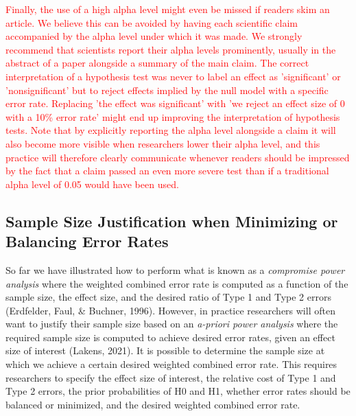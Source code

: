 \documentclass[
  english,
  ,man, a4paper,floatsintext]{apa6}
\begin{document}
\textcolor{red}{Finally, the use of a high alpha level might even be missed if readers skim an article. We believe this can be avoided by having each scientific claim accompanied by the alpha level under which it was made. We strongly recommend that scientists report their alpha levels prominently, usually in the abstract of a paper alongside a summary of the main claim. The correct interpretation of a hypothesis test was never to label an effect as 'significant' or 'nonsignificant' but to reject effects implied by the null model with a specific error rate. Replacing 'the effect was significant' with 'we reject an effect size of 0 with a 10\% error rate' might end up improving the interpretation of hypothesis tests. Note that by explicitly reporting the alpha level alongside a claim it will also become more visible when researchers lower their alpha level, and this practice will therefore clearly communicate whenever readers should be impressed by the fact that a claim passed an even more severe test than if a traditional alpha level of 0.05 would have been used.}

\hypertarget{sample-size-justification-when-minimizing-or-balancing-error-rates}{%
\subsection{Sample Size Justification when Minimizing or Balancing Error Rates}\label{sample-size-justification-when-minimizing-or-balancing-error-rates}}

So far we have illustrated how to perform what is known as a \emph{compromise power analysis} where the weighted combined error rate is computed as a function of the sample size, the effect size, and the desired ratio of Type 1 and Type 2 errors (Erdfelder, Faul, \& Buchner, 1996). However, in practice researchers will often want to justify their sample size based on an \emph{a-priori power analysis} where the required sample size is computed to achieve desired error rates, given an effect size of interest (Lakens, 2021). It is possible to determine the sample size at which we achieve a certain desired weighted combined error rate. This requires researchers to specify the effect size of interest, the relative cost of Type 1 and Type 2 errors, the prior probabilities of H0 and H1, whether error rates should be balanced or minimized, and the desired weighted combined error rate.
\end{document}
